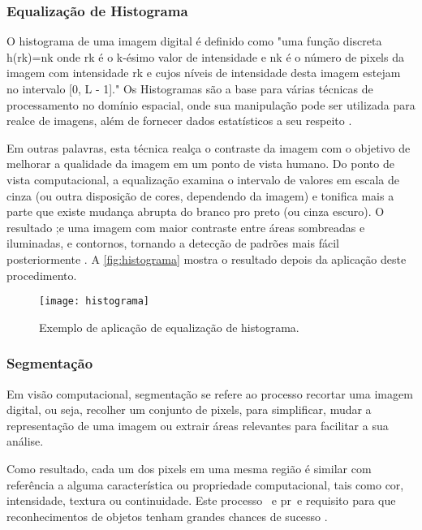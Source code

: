 \subsubsection{Equalização de Histograma}\label{subsubsec:equalizacao}

O histograma de uma imagem digital é definido como "uma função discreta h(rk)=nk onde  rk é o k-ésimo valor de intensidade e nk  é o número de pixels da imagem com intensidade rk e cujos níveis de intensidade desta imagem estejam no intervalo [0, L - 1]." Os Histogramas são a base para várias técnicas de processamento no domínio espacial, onde sua manipulação pode ser utilizada para realce de imagens, além de fornecer dados estatísticos a seu respeito \cite{gonzalez_woods}.

Em outras palavras, esta técnica realça o contraste da imagem com o objetivo de melhorar a qualidade da imagem em um ponto de vista humano. Do ponto de vista computacional, a equalização examina o intervalo de valores em escala de cinza (ou outra disposição de cores, dependendo da imagem) e tonifica mais a parte que existe mudança abrupta do branco pro preto (ou cinza escuro). O resultado ;e uma imagem com maior contraste entre áreas sombreadas e iluminadas, e contornos, tornando a detecção de padrões mais fácil posteriormente \cite{drmathew_java_programming}. A \autoref{fig:histograma} mostra o resultado depois da aplicação deste procedimento.

\begin{figure}[h]
	\centering
	\texttt{[image: histograma]}
	\caption{Exemplo de aplicação de equalização de  histograma.}
	\label{fig:histograma}
\end{figure}



\subsubsection{Segmentação}\label{subsubsec:segmentacao}

Em visão computacional, segmentação se refere ao processo recortar uma imagem digital, ou seja, recolher um conjunto de pixels, para simplificar, mudar a representação de uma imagem ou extrair áreas relevantes para facilitar a sua análise. 

Como resultado, cada um dos pixels em uma mesma região é similar com referência a alguma característica ou propriedade computacional, tais como cor, intensidade, textura ou continuidade. Este processo ~e pr~e requisito para que reconhecimentos de objetos tenham grandes chances de sucesso \cite{gonzalez_woods}.

